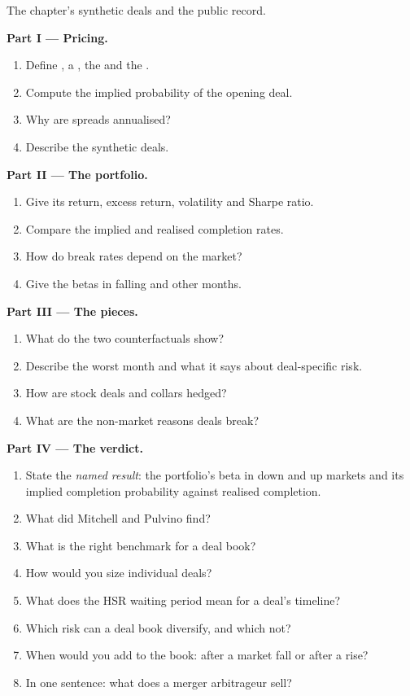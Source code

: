 \begin{problem}\label{pb:s1:merger-arbitrage:1}
The chapter's synthetic deals and the public record.

\medskip\noindent\textbf{Part I --- Pricing.}
\begin{enumerate}
\item Define , a , the  and the .
\item Compute the implied probability of the opening deal.
\item Why are spreads annualised?
\item Describe the synthetic deals.
\end{enumerate}

\medskip\noindent\textbf{Part II --- The portfolio.}
\begin{enumerate}[resume]
\item Give its return, excess return, volatility and Sharpe ratio.
\item Compare the implied and realised completion rates.
\item How do break rates depend on the market?
\item Give the betas in falling and other months.
\end{enumerate}

\medskip\noindent\textbf{Part III --- The pieces.}
\begin{enumerate}[resume]
\item What do the two counterfactuals show?
\item Describe the worst month and what it says about deal-specific risk.
\item How are stock deals and collars hedged?
\item What are the non-market reasons deals break?
\end{enumerate}

\medskip\noindent\textbf{Part IV --- The verdict.}
\begin{enumerate}[resume]
\item State the \emph{named result}: the portfolio's beta in down and up markets and its implied completion probability against realised completion.
\item What did Mitchell and Pulvino find?
\item What is the right benchmark for a deal book?
\item How would you size individual deals?
\item What does the HSR waiting period mean for a deal's timeline?
\item Which risk can a deal book diversify, and which not?
\item When would you add to the book: after a market fall or after a rise?
\item In one sentence: what does a merger arbitrageur sell?
\end{enumerate}
\end{problem}

